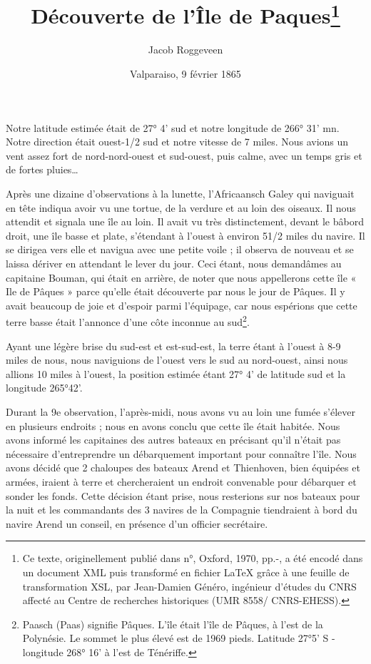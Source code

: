 \documentclass{article}
\title{Découverte de l'Île de Paques\footnote{Ce texte, originellement publié dans \textit{} n°, Oxford, 1970, pp.-, a été encodé dans un document XML puis transformé en fichier \LaTeX{} grâce à une feuille de transformation XSL, par Jean-Damien Généro, ingénieur d'études du CNRS affecté au Centre de recherches historiques (UMR 8558/ CNRS-EHESS).}}
\author{Jacob Roggeveen}
\date{Valparaiso, 9 février 1865}
\begin{document}
        \maketitle
        
      
         
        
    Notre latitude estimée était de 27° 4' sud et notre longitude de 266° 31' mn. Notre direction était ouest-1/2 sud et notre vitesse de 7 miles. Nous avions un vent assez fort de nord-nord-ouest et sud-ouest, puis calme, avec un temps gris et de fortes pluies…
         
        
    Après une dizaine d'observations à la lunette, l'Africaansch Galey qui naviguait en tête indiqua avoir vu une tortue, de la verdure et au loin des oiseaux. Il nous attendit et signala une île au loin. Il avait vu très distinctement, devant le bâbord droit, une île basse et plate, s'étendant à l'ouest à environ 51/2 miles du navire. Il se dirigea vers elle et navigua avec une petite voile ; il observa de nouveau et se laissa dériver en attendant le lever du jour. Ceci étant, nous demandâmes au capitaine Bouman, qui était en arrière, de noter que nous appellerons cette île « Ile de Pâques » parce qu'elle était découverte par nous le jour de Pâques. Il y avait beaucoup de joie et d'espoir parmi l'équipage, car nous espérions que cette terre basse était l'annonce d'une côte inconnue au sud\footnote{Paasch (Paas) signifie Pâques. L'île était l'île de Pâques, à l'est de la Polynésie. Le sommet le plus élevé est de 1969 pieds. Latitude 27°5' S - longitude 268° 16' à l'est de Ténériffe.}.
         
        
    Ayant une légère brise du sud-est et est-sud-est, la terre étant à l'ouest à 8-9 miles de nous, nous naviguions de l'ouest vers le sud au nord-ouest, ainsi nous allions 10 miles à l'ouest, la position estimée étant 27° 4' de latitude sud et la longitude 265°42'.
         
        
    Durant la 9e observation, l'après-midi, nous avons vu au loin une fumée s'élever en plusieurs endroits ; nous en avons conclu que cette île était habitée. Nous avons informé les capitaines des autres bateaux en précisant qu'il n'était pas nécessaire d'entreprendre un débarquement important pour connaître l'île. Nous avons décidé que 2 chaloupes des bateaux Arend et Thienhoven, bien équipées et armées, iraient à terre et chercheraient un endroit convenable pour débarquer et sonder les fonds. Cette décision étant prise, nous resterions sur nos bateaux pour la nuit et les commandants des 3 navires de la Compagnie tiendraient à bord du navire Arend un conseil, en présence d'un officier secrétaire.
         
\end{document}
